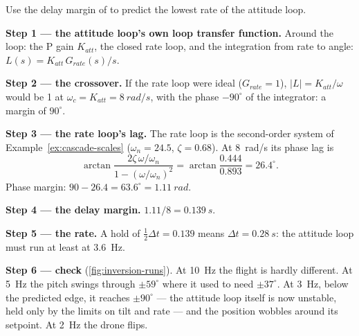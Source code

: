 \begin{example}
\label{ex:inv-rate}
Use the delay margin of  to predict the lowest rate of the attitude loop.

\textbf{Step 1 — the attitude loop's own loop transfer function.} Around the loop: the P gain $K_{att}$, the closed rate loop, and the integration from rate to angle: $L(s) = K_{att}\,G_{rate}(s)/s$.

\textbf{Step 2 — the crossover.} If the rate loop were ideal ($G_{rate} = 1$), $|L| = K_{att}/\omega$ would be 1 at $\omega_c = K_{att} = \SI{8}{rad/s}$, with the phase $-90^\circ$ of the integrator: a margin of $90^\circ$.

\textbf{Step 3 — the rate loop's lag.} The rate loop is the second-order system of Example~\ref{ex:cascade-scales} ($\omega_n = 24.5$, $\zeta = 0.68$). At \SI{8}{rad/s} its phase lag is
\begin{equation*}
  \arctan\frac{2\zeta\,\omega/\omega_n}{1 - (\omega/\omega_n)^2} = \arctan\frac{0.444}{0.893} = 26.4^\circ .
\end{equation*}
Phase margin: $90 - 26.4 = 63.6^\circ = \SI{1.11}{rad}$.

\textbf{Step 4 — the delay margin.} $1.11/8 = \SI{0.139}{s}$.

\textbf{Step 5 — the rate.} A hold of $\tfrac12\Delta t = 0.139$ means $\Delta t = \SI{0.28}{s}$: the attitude loop must run at least at \SI{3.6}{Hz}.

\textbf{Step 6 — check} (\cref{fig:inversion-runs}). At \SI{10}{Hz} the flight is hardly different. At \SI{5}{Hz} the pitch swings through $\pm59^\circ$ where it used to need $\pm37^\circ$. At \SI{3}{Hz}, below the predicted edge, it reaches $\pm90^\circ$ — the attitude loop itself is now unstable, held only by the limits on tilt and rate — and the position wobbles around its setpoint. At \SI{2}{Hz} the drone flips.
\end{example}


